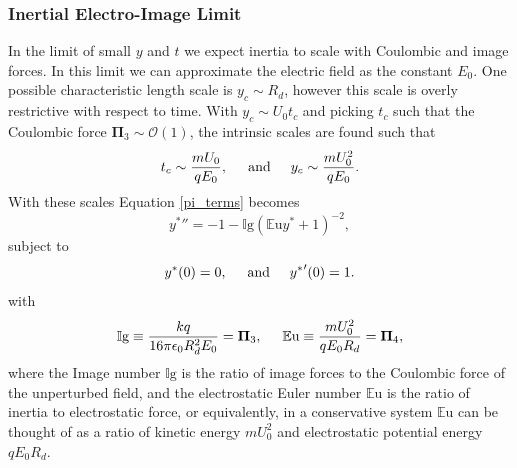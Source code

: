 \documentclass[aip,reprint, floatfix]{revtex4-1}
\begin{document}
\subsubsection{Inertial Electro-Image Limit}
In the limit of small $y$ and $t$ we expect inertia to scale with Coulombic and image forces. In this limit we can approximate the electric field as the constant $E_0$. One possible characteristic length scale is $y_c \sim R_d$, however this scale is overly restrictive with respect to time. With $y_c \sim U_0 t_c$ and picking $t_c$ such that the Coulombic force $\mathbf{\Pi}_3 \sim \mathcal{O}(1)$, the intrinsic scales are found such that
\[ t_c \sim \frac{m U_0}{q E_0}, \hspace{5 mm} \mbox{and} \hspace{5 mm} 
y_c \sim \frac{m U_0^2}{q E_0} .
\]
With these scales Equation \ref{pi_terms} becomes
\begin{equation}
{y^*}'' = -1 - \mathbb{I}\mbox{g} \left( \mathbb{E}\mbox{u}{y^*} + 1 \right)^{-2} , \label{img_limit}
\end{equation}
subject to
\begin{equation*}
{y^*}(0) = 0, \hspace{5 mm} \mbox{and} \hspace{5 mm} {y^*}'(0) = 1 .
\end{equation*}
with 
\[ \mathbb{I}\mbox{g} \equiv \frac{k q}{16 \pi \epsilon_0 R_d^2 E_0} = \mathbf{\Pi}_3, \hspace{5 mm}
\mathbb{E}\mbox{u} \equiv \frac{m U_0^2}{q E_0 R_d} = \mathbf{\Pi}_4 ,
\]
where the Image number $\mathbb{I}\mbox{g}$ is the ratio of image forces to the Coulombic force of the unperturbed field, and the electrostatic Euler number $\mathbb{E}\mbox{u}$ is the ratio of inertia to electrostatic force, or equivalently, in a conservative system $\mathbb{E}\mbox{u}$ can be thought of as a ratio of kinetic energy $m U_0^2$ and electrostatic potential energy $q E_0 R_d$.
\end{document}
